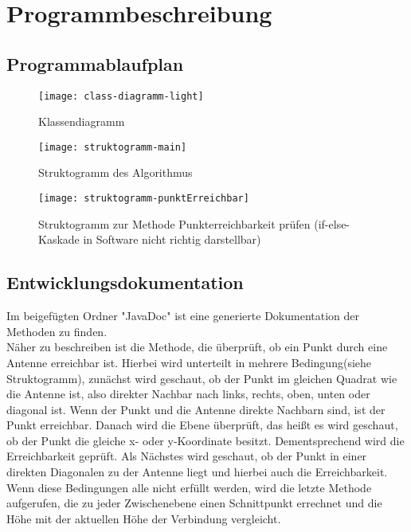 \chapter{Programmbeschreibung}\label{ch:programmbeschreibung}


\section{Programmablaufplan}\label{sec:pap}

\begin{figure}
    \centering
    \texttt{[image: class-diagramm-light]}
    \caption{Klassendiagramm}
    \label{fig:diagramm1}
\end{figure}

\begin{figure}
    \centering
    \texttt{[image: struktogramm-main]}
    \caption{Struktogramm des Algorithmus}
    \label{fig:diagramm2}
\end{figure}

\begin{figure}[htb]
    \centering
    \texttt{[image: struktogramm-punktErreichbar]}
    \caption{Struktogramm zur Methode Punkterreichbarkeit prüfen (if-else-Kaskade in Software nicht richtig darstellbar)}
    \label{fig:diagramm3}
\end{figure}



\section{Entwicklungsdokumentation}\label{sec:entwicklerdokumentation}
Im beigefügten Ordner "JavaDoc" ist eine generierte Dokumentation der Methoden zu finden.
\\
Näher zu beschreiben ist die Methode, die überprüft, ob ein Punkt durch eine Antenne erreichbar ist.
Hierbei wird unterteilt in mehrere Bedingung(siehe Struktogramm), zunächst wird geschaut, ob der Punkt im gleichen Quadrat wie die Antenne ist, also direkter Nachbar nach links, rechts, oben, unten oder diagonal ist.
Wenn der Punkt und die Antenne direkte Nachbarn sind, ist der Punkt erreichbar.
Danach wird die Ebene überprüft, das heißt es wird geschaut, ob der Punkt die gleiche x- oder y-Koordinate besitzt.
Dementsprechend wird die Erreichbarkeit geprüft.
Als Nächstes wird geschaut, ob der Punkt in einer direkten Diagonalen zu der Antenne liegt und hierbei auch die Erreichbarkeit.
Wenn diese Bedingungen alle nicht erfüllt werden, wird die letzte Methode aufgerufen, die zu jeder Zwischenebene einen Schnittpunkt errechnet und die Höhe mit der aktuellen Höhe der Verbindung vergleicht.

